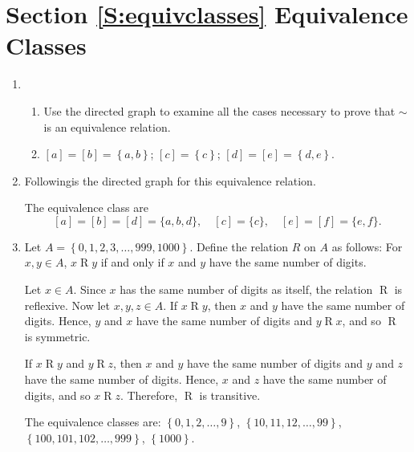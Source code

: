 \section*{Section \ref{S:equivclasses} Equivalence Classes}

\begin{enumerate}
\item \begin{enumerate}
\item Use the directed graph to examine all the cases necessary to prove that $\sim$ is an equivalence relation.

\item $\left[ a \right] = \left[ b \right] = \left\{ a,b \right\}$; $\left[ c \right] = \left\{ c \right\}$; $\left[ d \right] = \left[ e \right] = \left\{ d,e \right\}$.
\end{enumerate}



\item Followingis the directed graph for this equivalence relation.
\begin{figure}[h]
\begin{center}
\end{center}
\end{figure}

The equivalence class are
\[
[a] = [b] = [d] = \{a, b, d \}, \quad [c] = \{ c \}, \quad [e] = [f] = \{ e, f \}.
\]



\item Let   $A = \left\{ {0, 1, 2, 3,  \ldots , 999, 1000} \right\}$.  Define the relation  $R$  on  $A$  as follows:  For  $x, y \in A$,  $x \mathrel{R} y$ if and only if  $x$  and  $y$  have the same number of digits.

Let $x \in A$.  Since $x$ has the same number of digits as itself, the relation $\mathrel{R}$ is reflexive.  Now let $x, y, z \in A$.  If $x \mathrel{R} y$, then $x$  and  $y$  have the same number of digits.  Hence, $y$ and $x$ have the same number of digits and $y \mathrel{R} x$, and so $\mathrel{R}$ is symmetric.

If $x \mathrel{R} y$ and $y \mathrel{R} z$, then $x$  and  $y$  have the same number of digits and 
$y$  and  $z$  have the same number of digits.  Hence, $x$  and  $z$  have the same number of digits, and so $x \mathrel{R} z$.  Therefore, $\mathrel{R}$ is transitive.

The equivalence classes are:  
$\left\{ 0, 1, 2, \ldots , 9 \right\}$, $\left\{ 10, 11, 12, \ldots , 99 \right\}$, \\
$\left\{ 100, 101, 102, \ldots , 999 \right\}$, $\left\{ 1000 \right\}$.




\end{enumerate}
